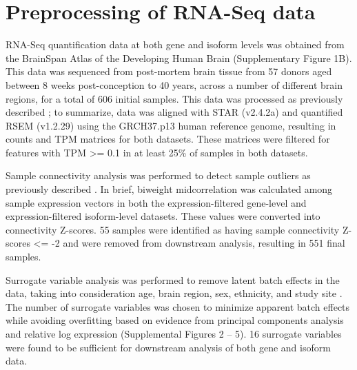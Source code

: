 \documentclass[12pt,chapterheads,final]{ucsd}
\begin{document}
\section{Preprocessing of RNA-Seq data}
RNA-Seq quantification data at both gene and isoform levels was obtained from the BrainSpan Atlas of the Developing Human Brain \cite{Hawrylycz2012,Kang2011,Miller2014} (Supplementary Figure 1B). This data was sequenced from post-mortem brain tissue from 57 donors aged between 8 weeks post-conception to 40 years, across a number of different brain regions, for a total of 606 initial samples. This data was processed as previously described \cite{Gandal2018}; to summarize, data was aligned with STAR (v2.4.2a) \cite{Dobin2013} and quantified RSEM (v1.2.29) \cite{Li2014} using the GRCH37.p13 human reference genome, resulting in counts and TPM matrices for both datasets. These matrices were filtered for features with TPM >= 0.1 in at least 25\% of samples in both datasets. \par
Sample connectivity analysis was performed to detect sample outliers as previously described \cite{Oldham2012}. In brief, biweight midcorrelation was calculated among sample expression vectors in both the expression-filtered gene-level and expression-filtered isoform-level datasets. These values were converted into connectivity Z-scores. 55 samples were identified as having sample connectivity Z-scores <= -2 and were removed from downstream analysis, resulting in 551 final samples. \par
Surrogate variable analysis was performed to remove latent batch effects in the data, taking into consideration age, brain region, sex, ethnicity, and study site \cite{Leek2014,Leek2007}. The number of surrogate variables was chosen to minimize apparent batch effects while avoiding overfitting based on evidence from principal components analysis and relative log expression (Supplemental Figures 2 – 5). 16 surrogate variables were found to be sufficient for downstream analysis of both gene and isoform data. \par
\end{document}
